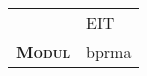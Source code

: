 \begin{titlepage}
    \maketitle

    \vspace{100mm}

    \begin{tabular}{r|l}

        \textsc{\textbf{}}
        & EIT\\
        [4mm]

        \textsc{\textbf{Modul}}
        & bprma \\
        [4mm]

    \end{tabular}

\end{titlepage}

